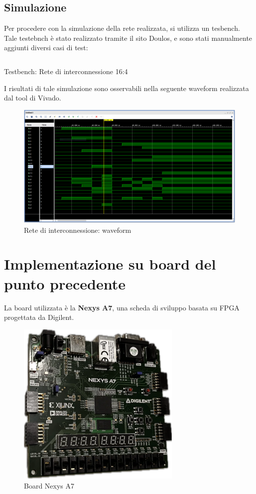 \subsection{Simulazione}
Per procedere con la simulazione della rete realizzata, si utilizza un tesbench. Tale testebnch è stato realizzato tramite il sito Doulos, e sono stati manualmente aggiunti diversi casi di test:
\begin{code}
    \inputminted[frame=lines, framesep=2mm, baselinestretch=1.2, bgcolor=LightGray, fontsize=\footnotesize, linenos]{vhdl}{vhdl_files/intercTb16_4.vhd}
    \caption{Testbench: Rete di interconnessione 16:4}
    \label{lst: R_int16_4TB}
\end{code}
I risultati di tale simulazione sono osservabili nella seguente waveform realizzata dal tool di Vivado.
\begin{figure}[H]
	\centering
	\includegraphics[width=1\textwidth]{img/TbReteInt}
	\caption{Rete di interconnessione: waveform}
	\label{R_int_sim} 
\end{figure}

\section{Implementazione su board del punto precedente}
La board utilizzata è la \textbf{Nexys A7}, una scheda di sviluppo basata su FPGA progettata da Digilent. 
\begin{figure}[H]
	\centering
	\includegraphics[width=0.7\textwidth]{img/board}
	\caption{Board Nexys A7}
	\label{board} 
\end{figure}
